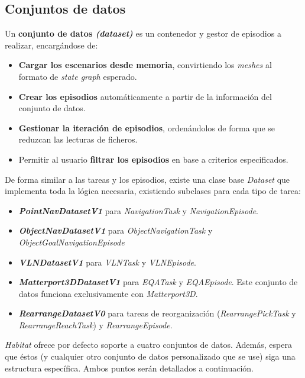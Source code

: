 \subsection{Conjuntos de datos}

Un \textbf{conjunto de datos \textit{(dataset)}} es un contenedor y gestor de episodios a realizar, encargándose de:

\begin{itemize}
	\item \textbf{Cargar los escenarios desde memoria}, convirtiendo los \textit{meshes} al formato de \textit{state graph} esperado.
	\item \textbf{Crear los episodios} automáticamente a partir de la información del conjunto de datos.
	\item \textbf{Gestionar la iteración de episodios}, ordenándolos de forma que se reduzcan las lecturas de ficheros.
	\item Permitir al usuario \textbf{filtrar los episodios} en base a criterios especificados.
\end{itemize}

De forma similar a las tareas y los episodios, existe una clase base \textit{Dataset} que implementa toda la lógica necesaria, existiendo subclases para cada tipo de tarea:

\begin{itemize}
\item \textbf{\textbf{\textit{PointNavDatasetV1}}} para \textit{NavigationTask} y \textit{NavigationEpisode}.
\item \textbf{\textit{ObjectNavDatasetV1}} para \textit{ObjectNavigationTask} y \textit{ObjectGoalNavigationEpisode}
\item \textbf{\textit{VLNDatasetV1}} para \textit{VLNTask} y \textit{VLNEpisode}.
\item \textbf{\textit{Matterport3DDatasetV1}} para \textit{EQATask} y \textit{EQAEpisode}. Este conjunto de datos funciona exclusivamente con \textit{Matterport3D}.
\item \textbf{\textit{RearrangeDatasetV0}} para tareas de reorganización (\textit{RearrangePickTask} y \textit{RearrangeReachTask}) y \textit{RearrangeEpisode}.
\end{itemize}

\textit{Habitat} ofrece por defecto soporte a cuatro conjuntos de datos. Además, espera que éstos (y cualquier otro conjunto de datos personalizado que se use) siga una estructura específica. Ambos puntos serán detallados a continuación.

